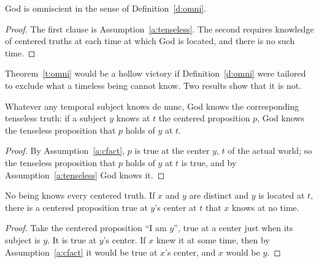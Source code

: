 \documentclass{situationist-preprint}
\begin{document}
\begin{theorem}\label{t:omni}
God is omniscient in the sense of Definition~\ref{d:omni}.
\end{theorem}

\begin{proof}
The first clause is Assumption~\ref{a:tenseless}. The second requires knowledge of centered truths at each time at which God is located, and there is no such time.
\end{proof}

Theorem~\ref{t:omni} would be a hollow victory if Definition~\ref{d:omni} were tailored to exclude what a timeless being cannot know. Two results show that it is not.

\begin{proposition}\label{p:gap}
Whatever any temporal subject knows de nunc, God knows the corresponding tenseless truth: if a subject $y$ knows at $t$ the centered proposition $p$, God knows the tenseless proposition that $p$ holds of $y$ at $t$.
\end{proposition}

\begin{proof}
By Assumption~\ref{a:cfact}, $p$ is true at the center $y$, $t$ of the actual world; so the tenseless proposition that $p$ holds of $y$ at $t$ is true, and by Assumption~\ref{a:tenseless} God knows it.
\end{proof}

\begin{proposition}\label{p:strong}
No being knows every centered truth. If $x$ and $y$ are distinct and $y$ is located at $t$, there is a centered proposition true at $y$'s center at $t$ that $x$ knows at no time.
\end{proposition}

\begin{proof}
Take the centered proposition \enquote{I am $y$}, true at a center just when its subject is $y$. It is true at $y$'s center. If $x$ knew it at some time, then by Assumption~\ref{a:cfact} it would be true at $x$'s center, and $x$ would be $y$.
\end{proof}
\end{document}
